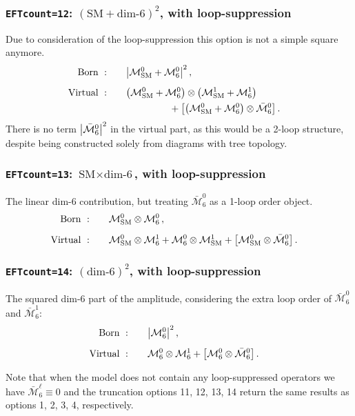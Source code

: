 \documentclass[11pt,a4paper]{refrep}
\def\M{\mathcal{M}}
\begin{document}
\subsubsection*{\bf\boldmath\texttt{EFTcount=12}: $(\text{SM}+\text{dim-6})^2$, with loop-suppression}
Due to consideration of the loop-suppression this option is not a simple square anymore.
\begin{align}
    \text{Born }: &\qquad \abs{\M_\mathrm{SM}^0+\M_6^0}^2\,,&\\[5pt]
    \text{Virtual }: &\qquad \qty(\M_\mathrm{SM}^0+\M_6^0)\otimes\qty(\M_\mathrm{SM}^1+\M_6^1)\notag\\&\hspace{65pt} + \qty[\qty(\M_\mathrm{SM}^0+\M_6^0)\otimes\bar{\M}_6^0]\,.&
\end{align}
There is no term $\abs{\bar{\M}_6^0}^2$ in the virtual part, as this would be a 2-loop structure, despite being constructed solely from diagrams with tree topology.

\subsubsection*{\bf\boldmath\texttt{EFTcount=13}: $\text{SM}\times\text{dim-6}$, with loop-suppression}
The linear dim-6 contribution, but treating $\bar{\M}_6^0$ as a 1-loop order object.
\begin{align}
    \text{Born }: &\qquad \M_\mathrm{SM}^0\otimes\M_6^0\,,&\\[5pt]
    \text{Virtual }: &\qquad \M_\mathrm{SM}^0\otimes\M_6^1 + \M_6^0\otimes\M_\mathrm{SM}^1 + \qty[\M_\mathrm{SM}^0\otimes\bar{\M}_6^0]\,.&
\end{align}

\subsubsection*{\bf\boldmath\texttt{EFTcount=14}: $(\text{dim-6})^2$, with loop-suppression}
The squared dim-6 part of the amplitude, considering the extra loop order of $\bar{\M}_6^0$ and $\bar{\M}_6^1$:
\begin{align}
    \text{Born }: &\qquad \abs{\M_6^0}^2\,,&\\[5pt]
    \text{Virtual }: &\qquad \M_6^0\otimes\M_6^1+\qty[\M_6^0\otimes\bar{\M}_6^0]\,.&
\end{align}

Note that when the model does not contain any loop-suppressed operators we have $\bar{\M}_6^\ell\equiv0$ and the truncation options 11, 12, 13, 14 return the same results as options 1, 2, 3, 4, respectively.
\end{document}
